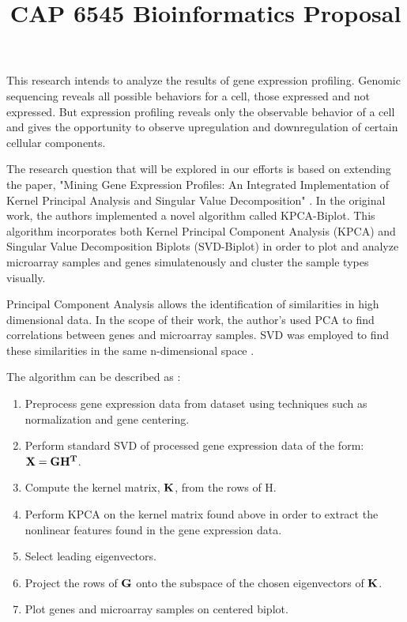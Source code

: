 \documentclass[10pt,a4,oneside]{report}
\begin{document}
\title{CAP 6545 Bioinformatics Proposal}
\maketitle

This research intends to analyze the results of gene expression profiling. Genomic sequencing reveals all possible behaviors for a cell, those expressed and not expressed. But expression profiling reveals only the observable behavior of a cell and gives the opportunity to observe upregulation and downregulation of certain cellular components.

The research question that will be explored in our efforts is based on extending the paper, "Mining Gene Expression Profiles: An Integrated Implementation of Kernel Principal Analysis and Singular Value Decomposition" \cite{Reverter2010200}.  In the original work, the authors implemented a novel algorithm called KPCA-Biplot. This algorithm incorporates both Kernel Principal Component Analysis (KPCA) and Singular Value Decomposition Biplots (SVD-Biplot) in order to plot and analyze microarray samples and genes simulatenously and cluster the sample types visually. 

Principal Component Analysis allows the identification of similarities in high dimensional data. In the scope of their work, the author's used PCA to find correlations between genes and microarray samples. SVD was employed to find these similarities in the same n-dimensional space \cite{Reverter2010200}.

The algorithm can be described as \cite{Reverter2010200}:

\begin{enumerate}  \itemsep -2pt %
\item
Preprocess gene expression data from dataset using techniques such as normalization and gene centering.
\item 
Perform standard SVD of processed gene expression data of the form: $\bf{X} = \bf{G}\bf{H}^{T}$.
\item
Compute the kernel matrix, $\bf{K}$, from  the rows of H.
\item
Perform KPCA on the kernel matrix found above in order to extract the nonlinear features found in the gene expression data.
\item
Select leading eigenvectors.
\item
Project the rows of $\bf{G}$ onto the subspace of the chosen eigenvectors of $\bf{K}$.
\item
Plot genes and microarray samples on centered biplot.
\end{enumerate}
\end{document}
